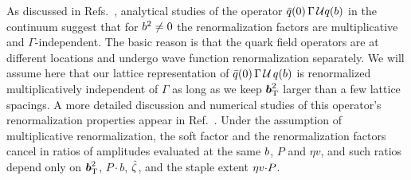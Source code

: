 As discussed in Refs.~\cite{Musch:2011er, Yoon:2017qzo}, analytical studies of the operator $\bar{q}(0)\, \Gamma\, \mathcal{U} q(b)$ in the continuum suggest that for $b^2 \neq 0$ the renormalization factors are multiplicative and $\Gamma$-independent. The basic reason is that the quark field operators are at different locations and undergo wave function renormalization separately. We will assume here that our lattice representation of $\bar{q}(0)\, \Gamma\, \mathcal{U}\, q(b)$ is renormalized multiplicatively independent of $\Gamma$ as long as we keep $\boldsymbol{b}_{\mathrm T}^2$ larger than a few lattice spacings. A more detailed discussion and numerical studies of this operator's renormalization properties appear in Ref.~\cite{Musch:2010ka}. Under the assumption of multiplicative renormalization, the soft factor and the renormalization factors cancel in ratios of amplitudes evaluated at the same $b$, $P$ and $\eta v$, and such ratios depend only on $\boldsymbol{b}_{\mathrm T}^2$, $P\cdot b$, ${\hat \zeta}$, and the staple extent $\eta v {\cdot} P$.


